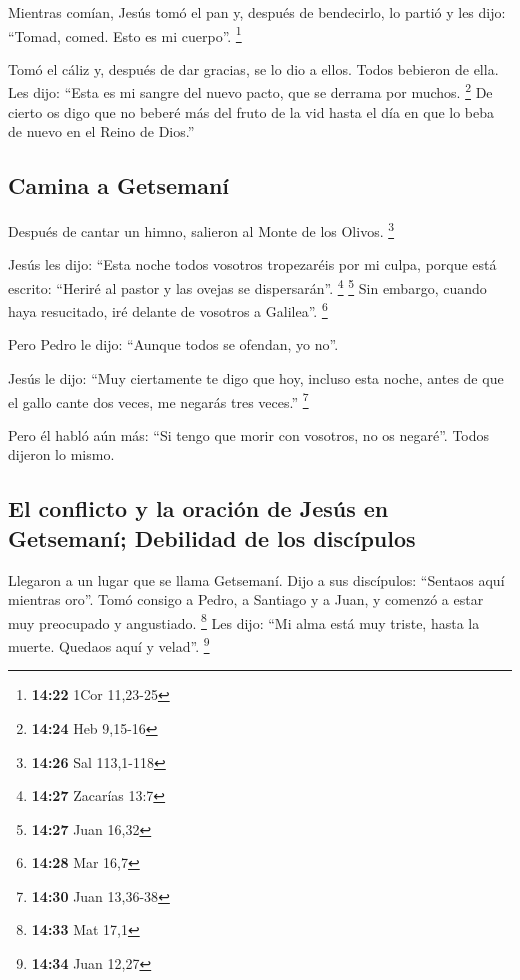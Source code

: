  Mientras comían, Jesús tomó el pan y, después de
bendecirlo, lo partió y les dijo: ``Tomad, comed. Esto es mi cuerpo''.
\footnote{\textbf{14:22} 1Cor 11,23-25}

 Tomó el cáliz y, después de dar gracias, se lo dio a
ellos. Todos bebieron de ella.  Les dijo: ``Esta es mi
sangre del nuevo pacto, que se derrama por muchos. \footnote{\textbf{14:24}
  Heb 9,15-16}  De cierto os digo que no beberé más del
fruto de la vid hasta el día en que lo beba de nuevo en el Reino de
Dios.''

\hypertarget{camina-a-getsemanuxed}{%
\subsection{Camina a Getsemaní}\label{camina-a-getsemanuxed}}

 Después de cantar un himno, salieron al Monte de los
Olivos. \footnote{\textbf{14:26} Sal 113,1-118}

 Jesús les dijo: ``Esta noche todos vosotros tropezaréis
por mi culpa, porque está escrito: ``Heriré al pastor y las ovejas se
dispersarán''. \footnote{\textbf{14:27} Zacarías 13:7} \footnote{\textbf{14:27}
  Juan 16,32}  Sin embargo, cuando haya resucitado, iré
delante de vosotros a Galilea''. \footnote{\textbf{14:28} Mar 16,7}

 Pero Pedro le dijo: ``Aunque todos se ofendan, yo no''.

 Jesús le dijo: ``Muy ciertamente te digo que hoy,
incluso esta noche, antes de que el gallo cante dos veces, me negarás
tres veces.'' \footnote{\textbf{14:30} Juan 13,36-38}

 Pero él habló aún más: ``Si tengo que morir con
vosotros, no os negaré''. Todos dijeron lo mismo.

\hypertarget{el-conflicto-y-la-oraciuxf3n-de-jesuxfas-en-getsemanuxed-debilidad-de-los-discuxedpulos}{%
\subsection{El conflicto y la oración de Jesús en Getsemaní; Debilidad
de los
discípulos}\label{el-conflicto-y-la-oraciuxf3n-de-jesuxfas-en-getsemanuxed-debilidad-de-los-discuxedpulos}}

 Llegaron a un lugar que se llama Getsemaní. Dijo a sus
discípulos: ``Sentaos aquí mientras oro''.  Tomó consigo
a Pedro, a Santiago y a Juan, y comenzó a estar muy preocupado y
angustiado. \footnote{\textbf{14:33} Mat 17,1}  Les dijo:
``Mi alma está muy triste, hasta la muerte. Quedaos aquí y velad''.
\footnote{\textbf{14:34} Juan 12,27}

